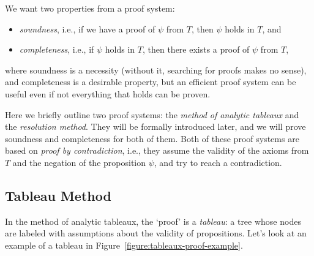 We want two properties from a proof system:
\begin{itemize}
    \item \emph{soundness}, i.e., if we have a proof of \( \psi \) from \( T \), then \( \psi \) holds in \( T \), and
    \item \emph{completeness}, i.e., if \( \psi \) holds in \( T \), then there exists a proof of \( \psi \) from \( T \),
\end{itemize}
where soundness is a necessity (without it, searching for proofs makes no sense), and completeness is a desirable property, but an efficient proof system can be useful even if not everything that holds can be proven.

Here we briefly outline two proof systems: the \emph{method of analytic tableaux} and the \emph{resolution method}. They will be formally introduced later, and we will prove soundness and completeness for both of them. Both of these proof systems are based on \emph{proof by contradiction}, i.e., they assume the validity of the axioms from \( T \) and the negation of the proposition \( \psi \), and try to reach a contradiction.


\subsection{Tableau Method}

In the method of analytic tableaux, the `proof' is a \emph{tableau}: a tree whose nodes are labeled with assumptions about the validity of propositions. Let's look at an example of a tableau in Figure~\ref{figure:tableaux-proof-example}.

